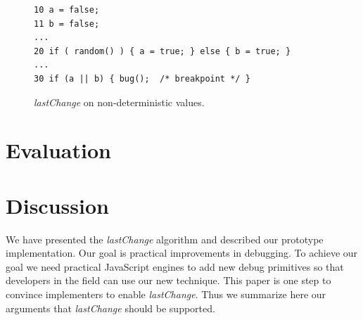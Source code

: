 \documentclass[runningheads,a4paper]{llncs}
\begin{document}
\begin{figure}[htp]
\begin{verbatim}
10 a = false;
11 b = false;
...
20 if ( random() ) { a = true; } else { b = true; }
...
30 if (a || b) { bug();  /* breakpoint */ }
\end{verbatim}
\caption{\textit{lastChange} on non-deterministic values.}
\label{fig:nondeterministic-values}
\end{figure}




\section{Evaluation}




\section{Discussion}

We have presented the \textit{lastChange} algorithm and described our
prototype implementation. Our goal is practical improvements in debugging. To achieve our goal we need practical JavaScript engines
to add new debug primitives so that developers in the field can use our new technique. This paper is
one step to convince implementers to enable \textit{lastChange}.
Thus we summarize here our arguments that \textit{lastChange} should be supported.
\end{document}
